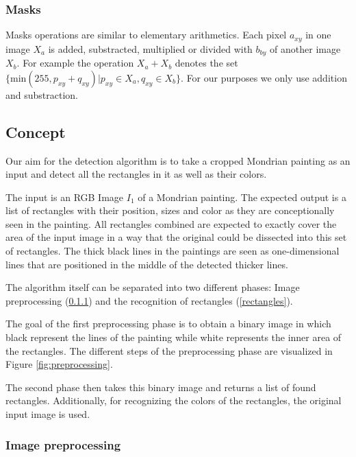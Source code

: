 \documentclass[serif,article,noparskip]{agse-thesis}
\begin{document}
\subsubsection{Masks}

Masks operations are similar to elementary arithmetics. Each pixel $a_{xy}$ in
one image  $X_a$ is added, substracted, multiplied or divided with $b_{by}$ of
another image $X_b$. For example the operation $X_a + X_b$ denotes the set
$\{\mathrm{min}(255, p_{xy} + q_{xy}) | p_{xy} \in X_a, q_{xy} \in X_b\}$. For our purposes we only
use addition and substraction.


\subsection{Concept} \label{concept}


Our aim for the detection algorithm is to take a cropped Mondrian painting as
an input and detect all the rectangles in it as well as their colors.

The input is an RGB Image $I_1$ of a Mondrian painting. The expected output is a
list of rectangles with their position, sizes and color as they are
conceptionally seen in the painting. All rectangles combined are expected to
exactly cover the area of the input image in a way that the original could be
dissected into this set of rectangles. The thick black lines in the paintings
are seen as one-dimensional lines that are positioned in the middle of the
detected thicker lines.

The algorithm itself can be separated into two different phases: Image
preprocessing (\ref{preprocessing}) and the recognition of rectangles (\ref{rectangles}).

The goal of the first preprocessing phase is to obtain a binary image in which
black represent the lines of the painting while white represents the inner area
of the rectangles. The different steps of the preprocessing phase are visualized
in Figure \ref{fig:preprocessing}.

The second phase then takes this binary image and returns a list of found
rectangles. Additionally, for recognizing the colors of the rectangles, the
original input image is used.

\subsubsection{Image preprocessing} \label{preprocessing}
\end{document}
